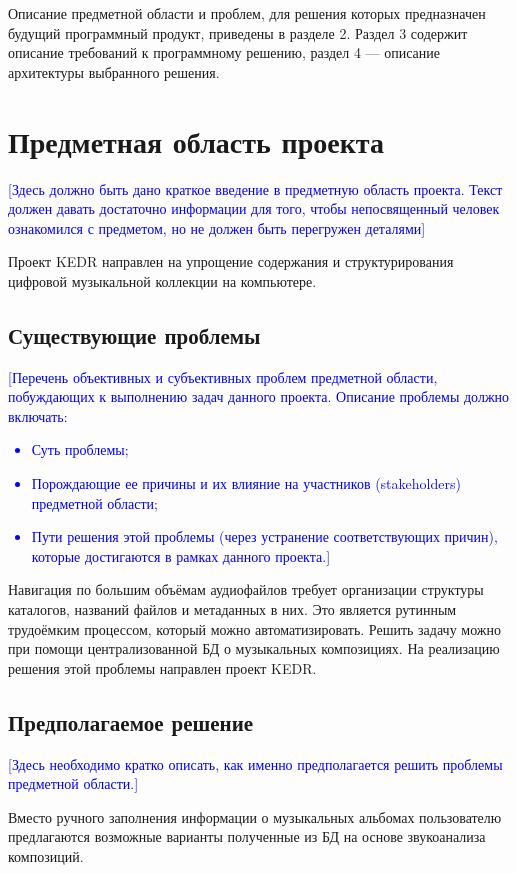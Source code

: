 \documentclass[pdftex,12pt,a4paper]{report}
\providecommand{\comment}[1]{\textcolor{blue}{#1}}
\begin{document}
Описание предметной области и проблем, для решения которых предназначен будущий программный продукт, приведены в разделе 2.
Раздел 3 содержит описание требований к программному решению, раздел 4 --- описание архитектуры выбранного решения.

\section{Предметная область проекта}
\comment{[Здесь должно быть дано краткое введение в предметную область проекта. Текст должен давать достаточно информации для того, чтобы непосвященный человек ознакомился с предметом, но не должен быть перегружен деталями]}

Проект KEDR направлен на упрощение содержания и структурирования цифровой музыкальной коллекции на компьютере.

\subsection{Существующие проблемы}
\comment{[Перечень объективных и субъективных проблем предметной области, побуждающих к выполнению задач данного проекта. Описание проблемы должно включать: 
	\begin{itemize}
		\item Суть проблемы;
		\item Порождающие ее причины и их влияние на участников (stakeholders)  предметной области; 
		\item Пути решения этой проблемы (через устранение соответствующих причин), которые достигаются в рамках данного проекта.]
	\end{itemize}}

Навигация по большим объёмам аудиофайлов требует организации структуры каталогов, названий файлов и метаданных в них.
Это является рутинным трудоёмким процессом, который можно автоматизировать.
Решить задачу можно при помощи централизованной БД о музыкальных композициях.
На реализацию решения этой проблемы направлен проект KEDR.

\subsection{Предполагаемое решение}
\comment{[Здесь необходимо кратко описать, как именно предполагается решить проблемы предметной области.]}

Вместо ручного заполнения информации о музыкальных альбомах пользователю предлагаются возможные варианты полученные из БД на основе звукоанализа композиций.
\end{document}
